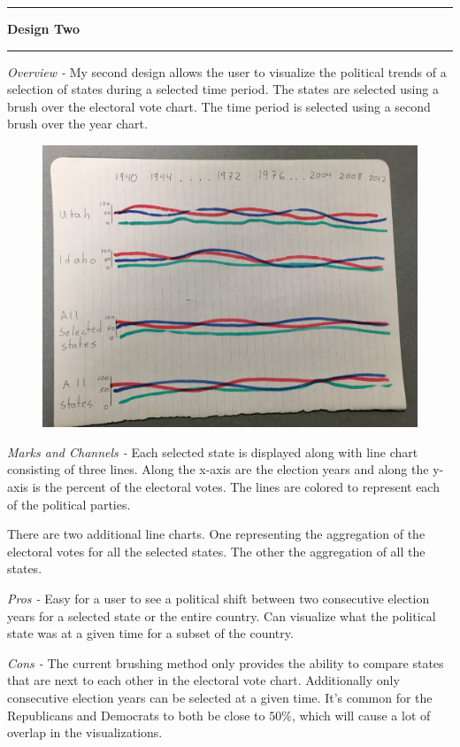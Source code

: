 \documentclass[11pt]{article}
\newcommand\question[1]{\vspace{.25in}\hrule\textbf{#1}\vspace{.5em}\hrule\vspace{.10in}}
\begin{document}
\newpage

\question{Design Two}

\textit{Overview -} My second design allows the user to visualize the political trends of a selection of states during a selected time period. The states are selected using a brush over the electoral vote chart. The time period is selected using a second brush over the year chart.

\begin{figure}[H]
  \centerline{\includegraphics[width=0.5\linewidth]{design_2.jpg}}
\end{figure}

\textit{Marks and Channels -} Each selected state is displayed along with line chart consisting of three lines. Along the x-axis are the election years and along the y-axis is the percent of the electoral votes. The lines are colored to represent each of the political parties.

There are two additional line charts. One representing the aggregation of the electoral votes for all the selected states. The other the aggregation of all the states.

\textit{Pros -} Easy for a user to see a political shift between two consecutive election years for a selected state or the entire country. Can visualize what the political state was at a given time for a subset of the country.

\textit{Cons -} The current brushing method only provides the ability to compare states that are next to each other in the electoral vote chart. Additionally only consecutive election years can be selected at a given time. It's common for the Republicans and Democrats to both be close to $50\%$, which will cause a lot of overlap in the visualizations.
\end{document}

